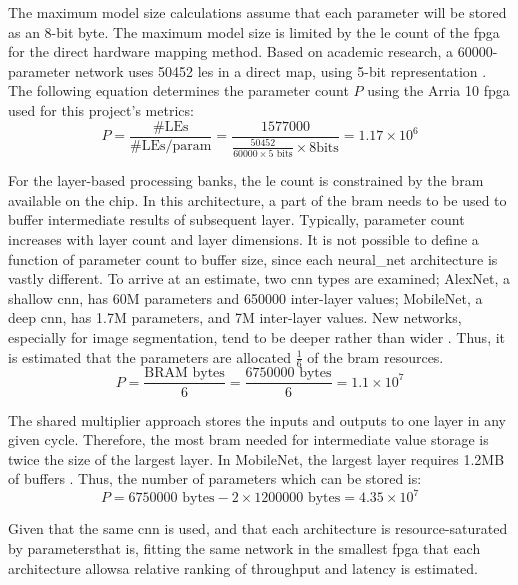 \documentclass{uw-ece-wkrpt}
\begin{document}
The maximum model size calculations assume that each parameter will be stored as an 8-bit byte. The maximum model size is limited by the \gls{le} count of the \gls{fpga} for the direct hardware mapping method. Based on academic research, a 60000-parameter network uses 50452 \glspl{le} in a direct map, using 5-bit representation \cite{Abdelouahab2017Hardware-Automa}. The following equation determines the parameter count $P$ using the Arria 10 \gls{fpga} \cite{Intel-Corp.2018IntelR-ArriaR-1} used for this project's metrics:
\begin{equation}
    P = \frac{\text{\# LEs}}{\text{\# LEs/param}} = \frac{1577000}{\frac{50452}{60000 \times 5 \text{ bits}} \times 8 \text{bits}} = 1.17 \times 10^6
\end{equation}

For the layer-based processing banks, the \gls{le} count is constrained by the \gls{bram} available on the chip. In this architecture, a part of the \gls{bram} needs to be used to buffer intermediate results of subsequent layer. Typically, parameter count increases with layer count and layer dimensions. It is not possible to define a function of parameter count to buffer size, since each \gls{neural_net} architecture is vastly different. To arrive at an estimate, two \gls{cnn} types are examined; AlexNet, a shallow \gls{cnn}, has 60M parameters and 650000 inter-layer values; MobileNet, a deep \gls{cnn}, has 1.7M parameters, and 7M inter-layer values. New networks, especially for image segmentation, tend to be deeper rather than wider \cite{Howard2017MobileNets:-Eff}. Thus, it is estimated that the parameters are allocated $\frac{1}{6}$ of the \gls{bram} resources.
\begin{equation}
    P = \frac{\text{BRAM bytes}}{6} = \frac{6750000 \text{ bytes}}{6} = 1.1 \times 10^7
\end{equation}

The shared multiplier approach stores the inputs and outputs to one layer in any given cycle. Therefore, the most \gls{bram} needed for intermediate value storage is twice the size of the largest layer. In MobileNet, the largest layer requires 1.2MB of buffers \cite{Howard2017MobileNets:-Eff}. Thus, the number of parameters which can be stored is:
\begin{equation}
    P = 6750000 \text{ bytes} - 2 \times 1200000 \text{ bytes} = 4.35 \times 10^7
\end{equation}

Given that the same \gls{cnn} is used, and that each architecture is resource-saturated by parameters\textemdash{}that is, fitting the same network in the smallest \gls{fpga} that each architecture allows\textemdash{}a relative ranking of throughput and latency is estimated.
\end{document}
